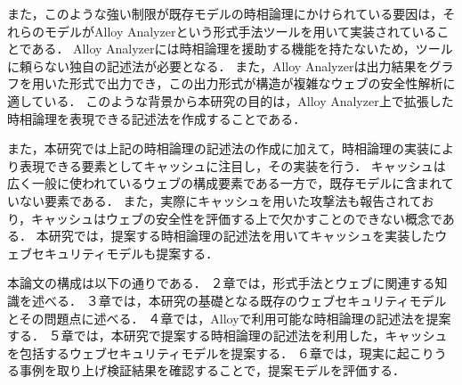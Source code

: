 \documentclass[12pt,a4paper]{jbook}
\begin{document}
また，このような強い制限が既存モデルの時相論理にかけられている要因は，それらのモデルがAlloy Analyzerという形式手法ツールを用いて実装されていることである．
Alloy Analyzerには時相論理を援助する機能を持たないため，ツールに頼らない独自の記述法が必要となる．
また，Alloy Analyzerは出力結果をグラフを用いた形式で出力でき，この出力形式が構造が複雑なウェブの安全性解析に適している．
このような背景から本研究の目的は，Alloy Analyzer上で拡張した時相論理を表現できる記述法を作成することである．

また，本研究では上記の時相論理の記述法の作成に加えて，時相論理の実装により表現できる要素としてキャッシュに注目し，その実装を行う．
キャッシュは広く一般に使われているウェブの構成要素である一方で，既存モデルに含まれていない要素である．
また，実際にキャッシュを用いた攻撃法\cite{bcpattack}も報告されており，キャッシュはウェブの安全性を評価する上で欠かすことのできない概念である．
本研究では，提案する時相論理の記述法を用いてキャッシュを実装したウェブセキュリティモデルも提案する．

本論文の構成は以下の通りである．
２章では，形式手法とウェブに関連する知識を述べる．
３章では，本研究の基礎となる既存のウェブセキュリティモデルとその問題点に述べる．
４章では，Alloyで利用可能な時相論理の記述法を提案する．
５章では，本研究で提案する時相論理の記述法を利用した，キャッシュを包括するウェブセキュリティモデルを提案する．
６章では，現実に起こりうる事例を取り上げ検証結果を確認することで，提案モデルを評価する．
\end{document}
